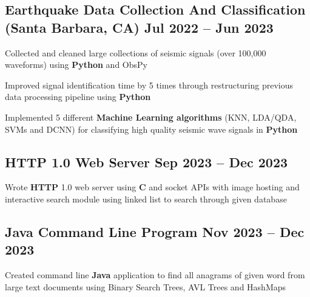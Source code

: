 \documentclass[a4paper,14pt]{article}
\begin{document}
\subsection{\texorpdfstring{Earthquake Data Collection And Classification  \hfill\textnormal{(Santa Barbara, CA)}	Jul 2022 -- Jun 2023}{Earthquake Data Collection And Classification  \textnormal{(Santa Barbara, CA)}	Jul 2022 -- Jun 2023}}
\begin{zitemize}
\item Collected and cleaned large collections of seismic signals (over 100,000 waveforms) using \textbf{Python} and ObsPy
\item Improved signal identification time by 5 times through restructuring previous data processing pipeline using \textbf{Python} 
\item Implemented 5 different \textbf{Machine Learning algorithms} (KNN, LDA/QDA, SVMs and DCNN) for classifying high quality seismic wave signals in \textbf{Python}
\end{zitemize}
\subsection{\texorpdfstring{HTTP 1.0 Web Server \hfill	Sep 2023 -- Dec 2023}{HTTP 1.0 Web Server Sep 2023 -- Dec 2023}}
\begin{zitemize}
\item Wrote \textbf{HTTP} 1.0 web server using \textbf{C} and socket APIs with image hosting and interactive search module using linked list to search through given database
\end{zitemize}
\subsection{\texorpdfstring{Java Command Line Program \hfill	Nov 2023 -- Dec 2023}{Java Command Line Program	Nov 2023 -- Dec 2023}}
\begin{zitemize}
\item Created command line \textbf{Java} application to find all anagrams of given word from large text documents using Binary Search Trees, AVL Trees and HashMaps
\end{zitemize}
\end{document}
